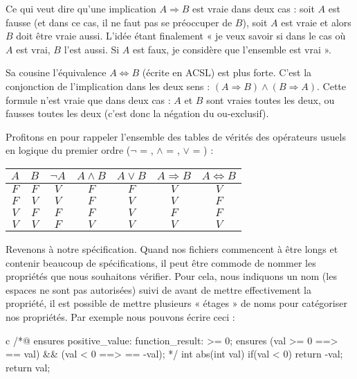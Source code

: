 Ce qui veut dire qu'une implication $A \Rightarrow B$ est vraie dans deux cas : 
soit $A$ est fausse (et dans ce cas, il ne faut pas se préoccuper de $B$), soit 
$A$ est vraie et alors $B$ doit être vraie aussi. L'idée étant finalement « je 
veux savoir si dans le cas où $A$ est vrai, $B$ l'est aussi. Si $A$ est faux, 
je considère que l'ensemble est vrai ».



Sa cousine l'équivalence $A \Leftrightarrow B$ (écrite  en ACSL)
est plus forte. C'est la conjonction de l'implication dans les deux sens :
$(A \Rightarrow B) \wedge (B \Rightarrow A)$. Cette formule n'est vraie que
dans deux cas : $A$ et $B$ sont vraies toutes les deux, ou fausses 
toutes les deux (c'est donc la négation du ou-exclusif).



\begin{Information}
Profitons en pour rappeler l'ensemble des tables de vérités des opérateurs
usuels en logique du premier ordre ($\neg$ = \CodeInline{!}, $\wedge$ = \CodeInline{\&\&},
$\vee$ = \CodeInline{||}) :

\begin{longtabu}{|c|c|c|c|c|c|c|} \hline
$A$ & $B$ & $\neg A$ & $A \wedge B$ & $A \vee B$ & $A \Rightarrow B$ & $A \Leftrightarrow B$ \\ \hline
$F$ & $F$ & $V$ & $F$ & $F$ & $V$ & $V$ \\ \hline
$F$ & $V$ & $V$ & $F$ & $V$ & $V$ & $F$ \\ \hline
$V$ & $F$ & $F$ & $F$ & $V$ & $F$ & $F$ \\ \hline
$V$ & $V$ & $F$ & $V$ & $V$ & $V$ & $V$ \\ \hline
\end{longtabu}
\end{Information}


Revenons à notre spécification. Quand nos fichiers commencent à être longs et 
contenir beaucoup de spécifications, il peut être commode de nommer les 
propriétés que nous souhaitons vérifier. Pour cela, nous indiquons un nom (les 
espaces ne sont pas autorisées) suivi de \CodeInline{:} avant de mettre effectivement
la propriété, il est possible de mettre plusieurs « étages » de noms pour 
catégoriser nos propriétés. Par exemple nous pouvons écrire ceci :



\begin{CodeBlock}{c}
/*@
  ensures positive_value: function_result: \result >= 0;
  ensures (val >= 0 ==> \result == val) && 
          (val < 0 ==> \result == -val);
*/
int abs(int val){
  if(val < 0) return -val;
  return val;
}
\end{CodeBlock}



